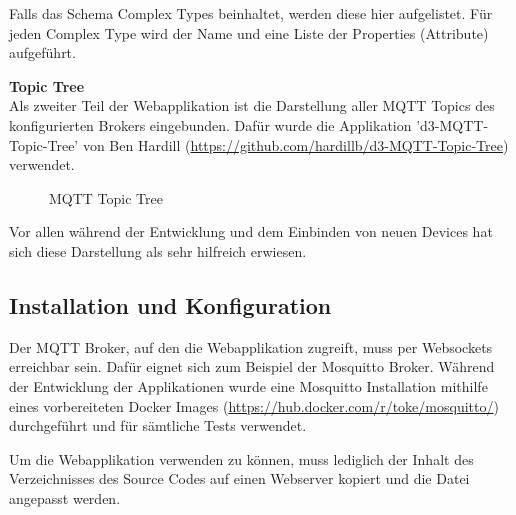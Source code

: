 {Falls das Schema Complex Types beinhaltet, werden diese hier aufgelistet. Für jeden Complex Type wird der Name und eine Liste der Properties (Attribute) aufgeführt.

\textbf{Topic Tree} \\
Als zweiter Teil der Webapplikation ist die Darstellung aller MQTT Topics des konfigurierten Brokers eingebunden. Dafür wurde die Applikation 'd3-MQTT-Topic-Tree' von Ben Hardill (\url{https://github.com/hardillb/d3-MQTT-Topic-Tree}) verwendet.

\begin{figure}[H]
	\centering
    \caption{MQTT Topic Tree}
\end{figure}

Vor allen während der Entwicklung und dem Einbinden von neuen Devices hat sich diese Darstellung als sehr hilfreich erwiesen.

\subsection{Installation und Konfiguration}
Der MQTT Broker, auf den die Webapplikation zugreift, muss per Websockets erreichbar sein. Dafür eignet sich zum Beispiel der Mosquitto Broker. Während der Entwicklung der Applikationen wurde eine Mosquitto Installation mithilfe eines vorbereiteten Docker Images (\url{https://hub.docker.com/r/toke/mosquitto/}) durchgeführt und für sämtliche Tests verwendet.

Um die Webapplikation verwenden zu können, muss lediglich der Inhalt des Verzeichnisses \newline  {} des Source Codes auf einen Webserver kopiert und die Datei  angepasst werden.

}
